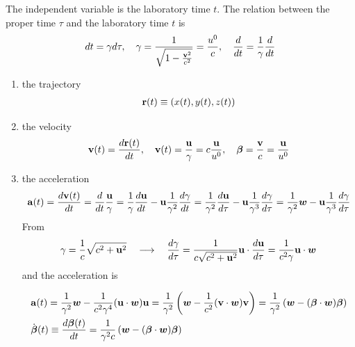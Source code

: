 The independent variable is the laboratory time $t$. The relation between the proper time $\tau$ and the laboratory time $t$ is
\begin{align}
  dt = \gamma d\tau,\quad  \gamma =\frac1{\sqrt{1-\frac{{\bf v}^2}{c^2}}}=\frac{u^0}{c},\quad
  \frac{d}{dt}=\frac{1}{\gamma}\frac{d}{dt}
\end{align}
\begin{enumerate}
  \item the trajectory
    \begin{align}
      {\bf r}(t) \equiv (x(t), y(t), z(t))
    \end{align}
  \item the velocity
    \begin{align}
      {\bf v}(t) =\frac{d{\bf r}(t)}{dt},\quad {\bf v}(t)=\frac{{\bf u}}{\gamma} = c\frac{\bf u}{u^0},\quad {\boldsymbol{\beta}} = \frac{\bf v}c=\frac{\bf u}{u^0}
    \end{align}
  \item the acceleration
    \begin{align}
      {\bf a}(t)=\frac{d{\bf v}(t)}{dt}=\frac{d}{dt}\frac{{\bf u}}{\gamma}=\frac1{\gamma}\frac{d{\bf u}}{dt}-{\bf u}\frac1{\gamma^2}\frac{d{\bf \gamma}}{dt}=\frac1{\gamma^2}\frac{d{\bf u}}{d\tau}-{\bf u}\frac1{\gamma^3}\frac{d{\bf \gamma}}{d\tau}=\frac1{\gamma^2}{\boldsymbol w}-{\bf u}\frac1{\gamma^3}\frac{d{\bf \gamma}}{d\tau}
    \end{align}
    From
    \begin{align}
      \gamma = \frac1c\sqrt{c^2+{\bf u}^2}\quad\longrightarrow\quad\frac{d\gamma}{d\tau}=\frac1{c\sqrt{c^2+{\bf u}^2}}{\bf u}\cdot\frac{d{\bf u}}{d\tau}=\frac1{c^2\gamma}{\bf u}\cdot{{\boldsymbol w}}
    \end{align}
    and the acceleration is
    \begin{importantbox}
      \begin{align}
        &    {\bf a}(t) = \frac1{\gamma^2}{\boldsymbol w}-\frac1{c^2\gamma^4}({\bf u}\cdot{\boldsymbol w}){\bf u}=\frac1{\gamma^2}\left({\boldsymbol w}-\frac1{c^2}({\bf v}\cdot{\boldsymbol w}){\bf v}\right)=\frac1{\gamma^2}\left({\boldsymbol w}-({\boldsymbol \beta}\cdot{\boldsymbol w}){\boldsymbol \beta}\right)\\
        &\dot{\boldsymbol\beta}(t)\equiv\frac{d{\boldsymbol\beta}(t)}{dt}=\frac1{\gamma^2c}\left({\boldsymbol w}-({\boldsymbol \beta}\cdot{\boldsymbol w}){\boldsymbol \beta}\right)
      \end{align}
    \end{importantbox}

\end{enumerate}

